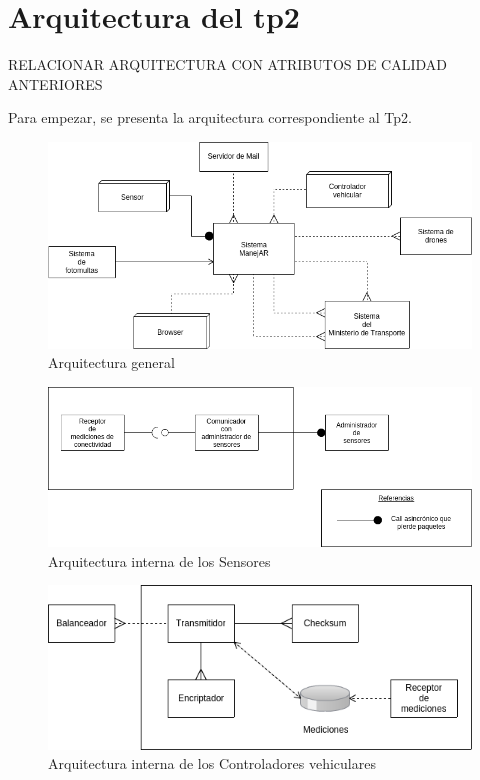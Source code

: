 \section{Arquitectura del tp2}
RELACIONAR ARQUITECTURA CON ATRIBUTOS DE CALIDAD ANTERIORES

Para empezar, se presenta la arquitectura correspondiente al Tp2.\newline



\begin{figure}
\centerline{\includegraphics[width=1\textwidth]{./imagenes/arquitectura_tp2/general.png}}
\caption{Arquitectura general}
\end{figure}


\begin{figure}
\centerline{\includegraphics[width=1\textwidth]{./imagenes/arquitectura_tp2/sensor.png}}
\caption{Arquitectura interna de los Sensores}
\end{figure}


\begin{figure}
\centerline{\includegraphics[width=1\textwidth]{./imagenes/arquitectura_tp2/controlador_vehicular.png}}
\caption{Arquitectura interna de los Controladores vehiculares}
\end{figure}


